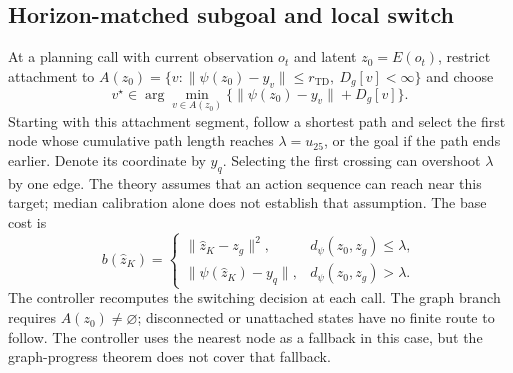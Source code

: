 \documentclass{article} %
\newcommand{\Htd}{r_{\mathrm{TD}}}
\newcommand{\dd}{d_{\psi}}
\theoremstyle{definition}
\theoremstyle{remark}
\begin{document}
\subsection{Horizon-matched subgoal and local switch}
\label{sec:subgoal}
At a planning call with current observation $o_t$ and latent $z_0=E(o_t)$, restrict attachment to
$A(z_0)=\{v:\|\psi(z_0)-y_v\|\le\Htd,\ D_g[v]<\infty\}$ and choose
\begin{equation}
 v^\star\in\arg\min_{v\in A(z_0)}
       \{\|\psi(z_0)-y_v\|+D_g[v]\}.
 \label{eq:startnode}
\end{equation}
Starting with this attachment segment, follow a shortest path and select the first node
whose cumulative path length reaches $\lambda=u_{25}$, or the goal if the path ends earlier.
Denote its coordinate by $y_q$. Selecting the first crossing can overshoot $\lambda$
by one edge. The theory assumes that an action sequence can reach near this target;
median calibration alone does not establish that assumption.
The base cost is
\begin{equation}
 b(\hat z_K)=
 \begin{cases}
   \|\hat z_K-z_g\|^2,& \dd(z_0,z_g)\le\lambda,\\
   \|\psi(\hat z_K)-y_q\|,& \dd(z_0,z_g)>\lambda .
 \end{cases}
 \label{eq:subgoal}
\end{equation}
The controller recomputes the switching decision at each call.
The graph branch requires $A(z_0)\ne\varnothing$; disconnected or unattached states
have no finite route to follow. The controller uses the nearest node as a fallback in this case,
but the graph-progress theorem does not cover that fallback.
\end{document}
